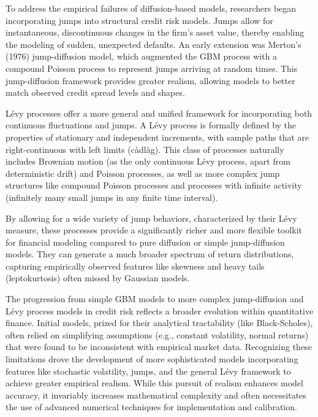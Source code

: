 \documentclass[11pt,twoside,openright]{report}
\begin{document}
To address the empirical failures of diffusion-based models, researchers began incorporating jumps into structural credit risk models. Jumps allow for instantaneous, discontinuous changes in the firm's asset value, thereby enabling the modeling of sudden, unexpected defaults. An early extension was Merton's (1976) jump-diffusion model, which augmented the GBM process with a compound Poisson process to represent jumps arriving at random times. This jump-diffusion framework provides greater realism, allowing models to better match observed credit spread levels and shapes.

Lévy processes offer a more general and unified framework for incorporating both continuous fluctuations and jumps. A Lévy process is formally defined by the properties of stationary and independent increments, with sample paths that are right-continuous with left limits (càdlàg). This class of processes naturally includes Brownian motion (as the only continuous Lévy process, apart from deterministic drift) and Poisson processes, as well as more complex jump structures like compound Poisson processes and processes with infinite activity (infinitely many small jumps in any finite time interval).

By allowing for a wide variety of jump behaviors, characterized by their Lévy measure, these processes provide a significantly richer and more flexible toolkit for financial modeling compared to pure diffusion or simple jump-diffusion models. They can generate a much broader spectrum of return distributions, capturing empirically observed features like skewness and heavy tails (leptokurtosis) often missed by Gaussian models.

The progression from simple GBM models to more complex jump-diffusion and Lévy process models in credit risk reflects a broader evolution within quantitative finance. Initial models, prized for their analytical tractability (like Black-Scholes), often relied on simplifying assumptions (e.g., constant volatility, normal returns) that were found to be inconsistent with empirical market data. Recognizing these limitations drove the development of more sophisticated models incorporating features like stochastic volatility, jumps, and the general Lévy framework to achieve greater empirical realism. While this pursuit of realism enhances model accuracy, it invariably increases mathematical complexity and often necessitates the use of advanced numerical techniques for implementation and calibration.

\end{document}

